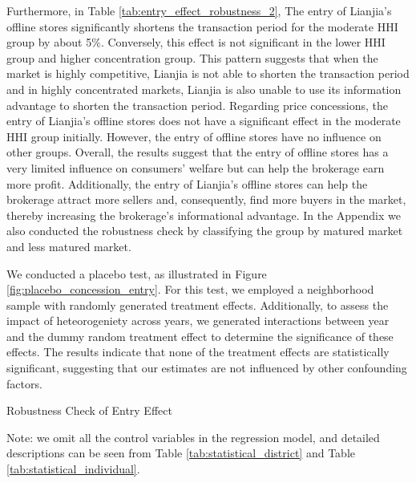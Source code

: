 \documentclass[11pt]{article}
\begin{document}
Furthermore, in Table \ref{tab:entry_effect_robustness_2}, The entry of Lianjia's offline stores significantly shortens the transaction period for the moderate HHI group by about 5\%. Conversely, this effect is not significant in the lower HHI group and higher concentration group. This pattern suggests that when the market is highly competitive, Lianjia is not able to shorten the transaction period and in highly concentrated markets, Lianjia is also unable to use its information advantage to shorten the transaction period. Regarding price concessions, the entry of Lianjia's offline stores does not have a significant effect in the moderate HHI group initially. However, the entry of offline stores have no influence on other groups. Overall, the results suggest that the entry of offline stores has a very limited influence on consumers' welfare but can help the brokerage earn more profit. Additionally, the entry of Lianjia's offline stores can help the brokerage attract more sellers and, consequently, find more buyers in the market, thereby increasing the brokerage's informational advantage. In the Appendix we also conducted the robustness check by classifying the group by matured market and less matured market.

We conducted a placebo test, as illustrated in Figure \ref{fig:placebo_concession_entry}. For this test, we employed a neighborhood sample with randomly generated treatment effects. Additionally, to assess the impact of heteorogeniety across years, we generated interactions between year and the dummy random treatment effect to determine the significance of these effects. The results indicate that none of the treatment effects are statistically significant, suggesting that our estimates are not influenced by other confounding factors.

\begin{table}
  \begin{center}
    \begin{scriptsize}
      \caption{Robustness Check of Entry Effect}
      \label{tab:entry_effect_robustness_1}
      
    
    Note: we omit all the control variables in the regression model, and detailed descriptions can be seen from Table \ref{tab:statistical_district} and Table \ref{tab:statistical_individual}.
    \end{scriptsize}
  \end{center}
\end{table}
\end{document}
